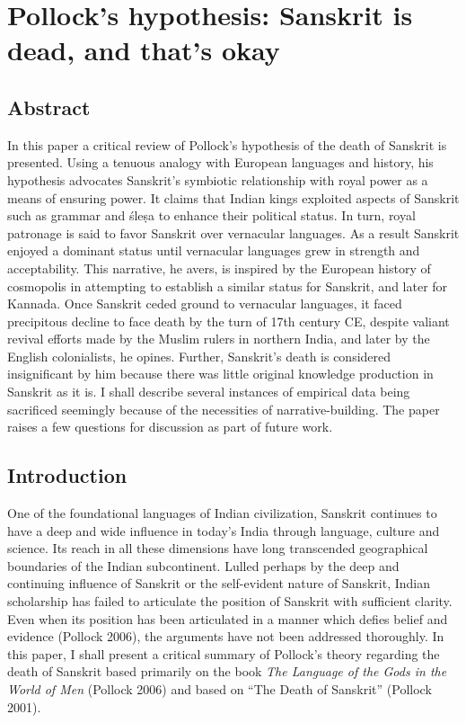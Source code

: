 \chapter{Pollock’s hypothesis: Sanskrit is dead, and that’s okay}\label{chapter4}

\section*{Abstract}

In this paper a critical review of Pollock’s hypothesis of the death of Sanskrit is presented. Using a tenuous analogy with European languages and history, his hypothesis advocates Sanskrit’s symbiotic relationship with royal power as a means of ensuring power. It claims that Indian kings exploited aspects of Sanskrit such as grammar and śleṣa to enhance their political status. In turn, royal patronage is said to favor Sanskrit over vernacular languages. As a result Sanskrit enjoyed a dominant status until vernacular languages grew in strength and acceptability. This narrative, he avers, is inspired by the European history of cosmopolis in attempting to establish a similar status for Sanskrit, and later for Kannada. Once Sanskrit ceded ground to vernacular languages, it faced precipitous decline to face death by the turn of 17th century CE, despite valiant revival efforts made by the Muslim rulers in northern India, and later by the English colonialists, he opines. Further, Sanskrit’s death is considered insignificant by him because there was little original knowledge production in Sanskrit as it is. I shall describe several instances of empirical data being sacrificed seemingly because of the necessities of narrative-building. The paper raises a few questions for discussion as part of future work.

\section*{Introduction}

One of the foundational languages of Indian civilization, Sanskrit continues to have a deep and wide influence in today’s India through language, culture and science. Its reach in all these dimensions have long transcended geographical boundaries of the Indian subcontinent. Lulled perhaps by the deep and continuing influence of Sanskrit or the self-evident nature of Sanskrit, Indian scholarship has failed to articulate the position of Sanskrit with sufficient clarity. Even when its position has been articulated in a manner which defies belief and evidence (Pollock 2006), the arguments have not been addressed thoroughly. In this paper, I shall present a critical summary of Pollock’s theory regarding the death of Sanskrit based primarily on the book {\sl The Language of the Gods in the World of Men} (Pollock 2006) and based on “The Death of Sanskrit” (Pollock 2001).

